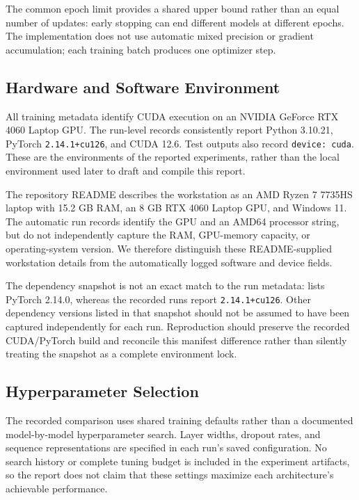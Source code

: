 The common epoch limit provides a shared upper bound rather than an equal number of updates: early stopping can end different models at different epochs. The implementation does not use automatic mixed precision or gradient accumulation; each training batch produces one optimizer step.

\subsection{Hardware and Software Environment}

All training metadata identify CUDA execution on an NVIDIA GeForce RTX 4060 Laptop GPU. The run-level records consistently report Python 3.10.21, PyTorch \texttt{2.14.1+cu126}, and CUDA 12.6. Test outputs also record \texttt{device: cuda}. These are the environments of the reported experiments, rather than the local environment used later to draft and compile this report.

The repository README describes the workstation as an AMD Ryzen 7 7735HS laptop with 15.2 GB RAM, an 8 GB RTX 4060 Laptop GPU, and Windows 11. The automatic run records identify the GPU and an AMD64 processor string, but do not independently capture the RAM, GPU-memory capacity, or operating-system version. We therefore distinguish these README-supplied workstation details from the automatically logged software and device fields.

The dependency snapshot is not an exact match to the run metadata:  lists PyTorch 2.14.0, whereas the recorded runs report \texttt{2.14.1+cu126}. Other dependency versions listed in that snapshot should not be assumed to have been captured independently for each run. Reproduction should preserve the recorded CUDA/PyTorch build and reconcile this manifest difference rather than silently treating the snapshot as a complete environment lock.

\subsection{Hyperparameter Selection}

The recorded comparison uses shared training defaults rather than a documented model-by-model hyperparameter search. Layer widths, dropout rates, and sequence representations are specified in each run's saved configuration. No search history or complete tuning budget is included in the experiment artifacts, so the report does not claim that these settings maximize each architecture's achievable performance.

